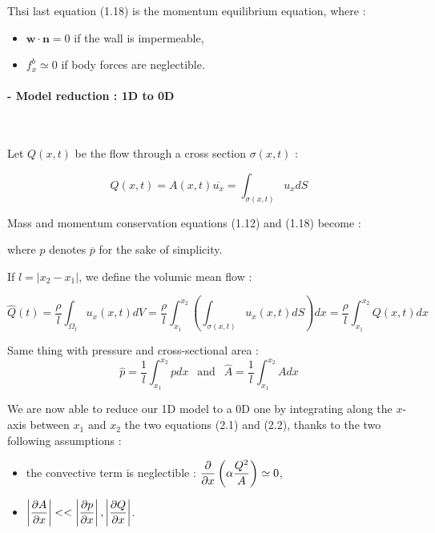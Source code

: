 \documentclass[a4paper]{article}
\begin{document}

\rem Thsi last equation (1.18) is the momentum equilibrium equation, where :
\begin{itemize}
\item $\mathbf w\cdot\mathbf n=0$ if the wall is impermeable,
\item $f^b_x\simeq0$ if body forces are neglectible.
\end{itemize}



\newpage
{}
\setcounter{d}{0}
\setcounter{e}{0}
\paragraph{ - Model reduction : 1D to 0D}~


 Let $Q(x,t)$ be the flow through a cross section $\sigma(x,t)$ :

$$Q(x,t)=A(x,t)\overline{u_x}=\int_{\sigma(x,t)}u_xdS$$

\noindent Mass and momentum conservation equations (1.12) and (1.18) become :


\noindent where $p$ denotes $\overline p$ for the sake of simplicity.

 If $l=|x_2-x_1|$, we define the volumic mean flow :

$$\hat Q(t)=\frac\rho l\int_{\Omega_t} u_x(x,t)dV=\frac\rho l\int_{x_1}^{x_2}\left(\int_{\sigma(x,t)} u_x(x,t)dS\right)dx=\frac\rho l\int_{x_1}^{x_2}Q(x,t)dx$$

\noindent Same thing with pressure and cross-sectional area :
$$\hat p=\frac1l\int_{x_1}^{x_2}pdx~~\text{ and }~~\hat A=\frac1l\int_{x_1}^{x_2}Adx$$

We are now able to reduce our 1D model to a 0D one by integrating along the $x$-axis between $x_1$ and $x_2$ the two equations (2.1) and (2.2), thanks to the two following assumptions :

\begin{itemize}
\item the convective term is neglectible : $\displaystyle\frac{\partial}{\partial x}\left(\alpha\frac {Q^2}A\right)\simeq 0$,
\item $\left|\displaystyle\frac{\partial A}{\partial x}\right|<<\left|\displaystyle\frac{\partial p}{\partial x}\right|,\left|\displaystyle\frac{\partial Q}{\partial x}\right|$.
\end{itemize}
\end{document}
